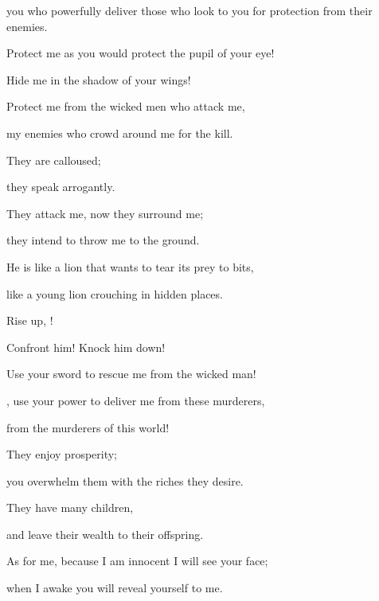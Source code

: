 {\par }{\Q you who powerfully
deliver
those who look to you for protection from their enemies.
\par }{\Q {}Protect me as you would protect
the pupil
of your eye!

\par }{\Q Hide
me in the shadow
of your wings!
\par }{\Q {}Protect me from
the wicked
men who
attack
me,
\par }{\Q my enemies
who crowd around me for the kill.
\par }{\Q {}They are calloused;
\par }{\Q they speak
arrogantly.
\par }{\Q {}They attack
me, now
they surround
me;

\par }{\Q they intend
to throw
me to the ground.
\par }{\Q {}He is like
a lion
that wants to tear
its prey to bits,

\par }{\Q like a young lion
crouching
in hidden places.
\par }{\Q {}Rise
up,
{}!
\par }{\Q Confront
him! Knock
him down!

\par }{\Q Use your sword
to rescue
me
from the wicked man!
\par }{\Q {}, use your power
to deliver me from these murderers,
\par }{\Q from the murderers
of this world!

\par }{\Q They enjoy prosperity;
\par }{\Q you overwhelm
them with the riches
they desire.

\par }{\Q They have many
children,
\par }{\Q and leave
their wealth
to their offspring.
\par }{\Q {}As for me, because I
am innocent
I will see
your face;
\par }{\Q when I awake you will reveal yourself to me.


\par }
